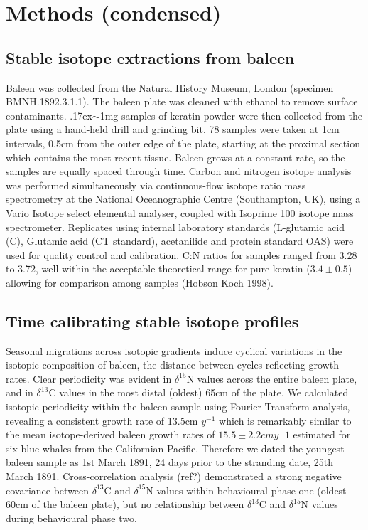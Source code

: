 \documentclass[a4paper,12pt]{article}
\begin{document}
\section{Methods (condensed)}

\subsection{Stable isotope extractions from baleen}
Baleen was collected from the Natural History Museum, London (specimen BMNH.1892.3.1.1). 
The baleen plate was cleaned with ethanol to remove surface contaminants. 
{\raise.17ex\hbox{$\scriptstyle\sim$}}1mg samples of keratin powder were then collected from the plate using a hand-held drill and grinding bit. 
78 samples were taken at 1cm intervals, 0.5cm from the outer edge of the plate, starting at the proximal section which contains the most recent tissue. 
Baleen grows at a constant rate, so the samples are equally spaced through time\cite{best1996stable}. Carbon and nitrogen isotope analysis was performed simultaneously via continuous-flow isotope ratio mass spectrometry at the National Oceanographic Centre (Southampton, UK), using a Vario Isotope select elemental analyser, coupled with Isoprime 100 isotope mass spectrometer. 
Replicates using internal laboratory standards (L-glutamic acid (C), Glutamic acid (CT standard), acetanilide and protein standard OAS) were used for quality control and calibration. 
C:N ratios for samples ranged from 3.28\text{\textperthousand} to 3.72\text{\textperthousand}, well within the acceptable theoretical range for pure keratin ($3.4\pm0.5$) allowing for comparison among samples (Hobson  Koch 1998). 
 
\subsection{Time calibrating stable isotope profiles}
Seasonal migrations across isotopic gradients induce cyclical variations in the isotopic composition of baleen, the distance between cycles reflecting growth rates\cite{hobson1998stable,busquets2017estimating}. 
Clear periodicity was evident in $\delta^{15}$N values across the entire baleen plate, and in $\delta^{13}$C values in the most distal (oldest) 65cm of the plate. 
We calculated isotopic periodicity within the baleen sample using Fourier Transform analysis\cite{cardona2017temporal}, revealing a consistent growth rate of 13.5cm $y^{-1}$ which is remarkably similar to the mean isotope-derived baleen growth rates of $15.5 \pm 2.2cm y{^-1}$ estimated for six blue whales from the Californian Pacific\cite{busquets2017estimating}.  
Therefore we dated the youngest baleen sample as 1st March 1891, 24 days prior to the stranding date, 25th March 1891. 
Cross-correlation analysis (ref?) demonstrated a strong negative covariance between $\delta^{13}$C and $\delta^{15}$N values within behavioural phase one (oldest 60cm of the baleen plate), but no relationship between $\delta^{13}$C and $\delta^{15}$N values during behavioural phase two.
 
\end{document}
